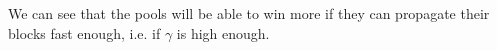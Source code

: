 \begin{figure}[ht]
\centering

 \newline

\vspace{1cm}

 \newline
\end{figure}

\begin{figure}[ht]
\centering
{} \newline
\end{figure}
\medskip

\clearpage
We can see that the pools will be able to win more if they can propagate their blocks fast enough, i.e. if $\gamma$ is high enough.

